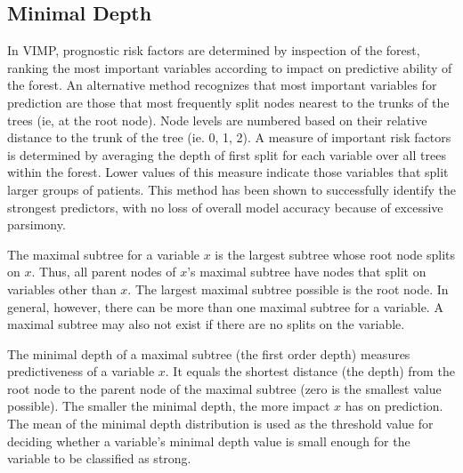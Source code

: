 \documentclass[nojss,letterpaper]{jss}\usepackage[]{graphicx}\usepackage[]{color}
\begin{document}
\subsection{Minimal Depth}\label{S:minimalDepth}
In VIMP, prognostic risk factors are determined by inspection of the forest, ranking the most important variables according to impact on predictive ability of the forest. An alternative method recognizes that most important variables for prediction are those that most frequently split nodes nearest to the trunks of the trees (ie, at the root node). Node levels are numbered based on their relative distance to the trunk of the tree (ie. 0, 1, 2).  A measure of important risk factors is determined by averaging the depth of first split for each variable over all trees within the forest. Lower values of this measure indicate those variables that split larger groups of patients. This method has been shown to successfully identify the strongest predictors, with no loss of overall model accuracy because of excessive parsimony.

The maximal subtree for a variable $x$ is the largest subtree whose root node splits on $x$. Thus, all parent nodes of $x$'s maximal subtree have nodes that split on variables other than $x$. The largest maximal subtree possible is the root node. In general, however, there can be more than one maximal subtree for a variable. A maximal subtree may also not exist if there are no splits on the variable.

The minimal depth of a maximal subtree (the first order depth) measures predictiveness of a variable $x$. It equals the shortest distance (the depth) from the root node to the parent node of the maximal subtree (zero is the smallest value possible). The smaller the minimal depth, the more impact $x$ has on prediction. The mean of the minimal depth distribution is used as the threshold value for deciding whether a variable's minimal depth value is small enough for the variable to be classified as strong. 

% 
\end{document}
